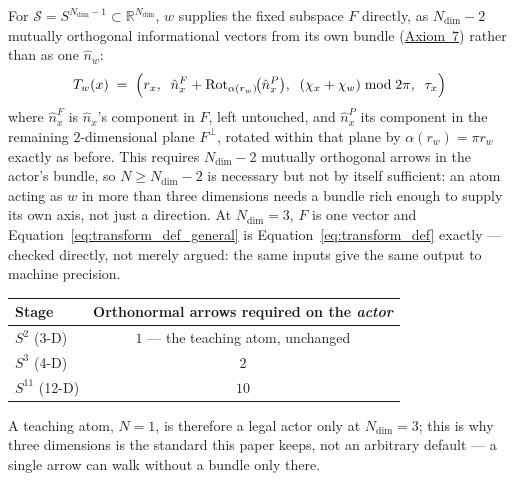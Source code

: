 \documentclass[12pt, a4paper]{article}
\begin{document}
For $\mathcal{S}=S^{N_{\mathrm{dim}}-1}\subset\mathbb{R}^{N_{\mathrm{dim}}}$,
$w$ supplies the fixed subspace $F$ directly, as $N_{\mathrm{dim}}-2$
mutually orthogonal informational vectors from its own bundle
(\hyperref[subsec:axiom_v1_metrics]{Axiom~7}) rather than as one $\hat n_w$:
\begin{equation}
    T_w(x)
    \;=\;
    \Bigl(
        r_x,\;\;
        \hat n_x^F + \mathrm{Rot}_{\alpha(r_w)}\!\bigl(\hat n_x^P\bigr),\;\;
        (\chi_x + \chi_w) \bmod 2\pi,\;\;
        \tau_x
    \Bigr)
    \label{eq:transform_def_general}
\end{equation}
where $\hat n_x^F$ is $\hat n_x$'s component in $F$, left untouched,
and $\hat n_x^P$ its component in the remaining $2$-dimensional plane
$F^\perp$, rotated within that plane by $\alpha(r_w)=\pi r_w$ exactly
as before. This requires $N_{\mathrm{dim}}-2$ mutually orthogonal
arrows in the actor's bundle, so $N\ge N_{\mathrm{dim}}-2$ is
necessary but not by itself sufficient: an atom acting as
$w$ in more than three dimensions needs a bundle rich enough to
supply its own axis, not just a direction. At $N_{\mathrm{dim}}=3$,
$F$ is one vector and Equation~\eqref{eq:transform_def_general} is
Equation~\eqref{eq:transform_def} exactly --- checked directly, not
merely argued: the same inputs give the same output to machine
precision.

\begin{center}
\begin{tabular}{lc}
Stage & Orthonormal arrows required on the \emph{actor} \\
\hline
$S^2$ (3-D) & $1$ --- the teaching atom, unchanged \\
$S^3$ (4-D) & $2$ \\
$S^{11}$ (12-D) & $10$ \\
\end{tabular}
\end{center}
A teaching atom, $N=1$, is therefore a legal actor only at
$N_{\mathrm{dim}}=3$; this is why three dimensions is the standard
this paper keeps, not an arbitrary default --- a single arrow can
walk without a bundle only there.
\end{document}
